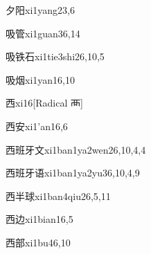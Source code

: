 
\begin{verbete}{夕阳}{xi1yang2}{3,6}
\end{verbete}

\begin{verbete}{吸管}{xi1guan3}{6,14}
\end{verbete}

\begin{verbete}{吸铁石}{xi1tie3shi2}{6,10,5}
\end{verbete}

\begin{verbete}{吸烟}{xi1yan1}{6,10}
\end{verbete}

\begin{verbete}{西}{xi1}{6}[Radical 襾]
\end{verbete}

\begin{verbete}{西安}{xi1'an1}{6,6}
\end{verbete}

\begin{verbete}{西班牙文}{xi1ban1ya2wen2}{6,10,4,4}
\end{verbete}

\begin{verbete}{西班牙语}{xi1ban1ya2yu3}{6,10,4,9}
\end{verbete}

\begin{verbete}{西半球}{xi1ban4qiu2}{6,5,11}
\end{verbete}

\begin{verbete}{西边}{xi1bian1}{6,5}
\end{verbete}

\begin{verbete}{西部}{xi1bu4}{6,10}
\end{verbete}

